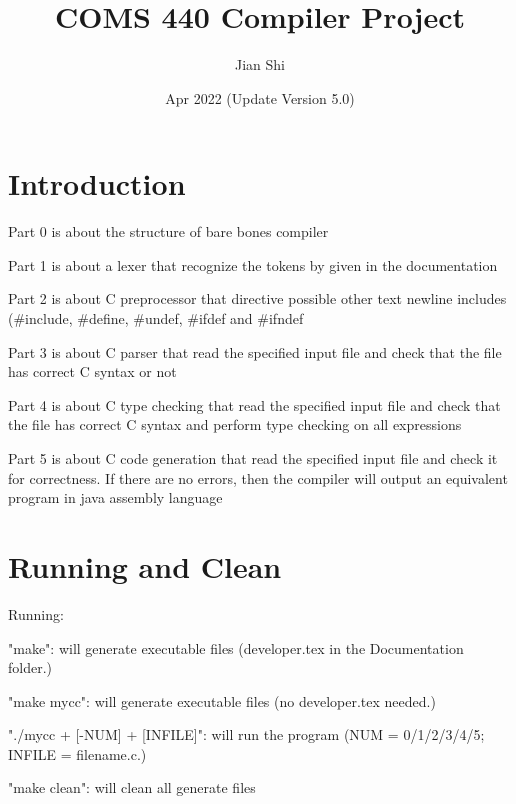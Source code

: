 \documentclass{article}
\title{COMS 440 Compiler Project}
\author{Jian Shi}
\date{Apr 2022 (Update Version 5.0)}
\begin{document}
\maketitle{}

\section{Introduction}

\par{Part 0 is about the structure of bare bones compiler}
\par{Part 1 is about a lexer that recognize the tokens by given in the documentation}
\par{Part 2 is about C preprocessor that directive possible other text newline includes (\#include, \#define, \#undef, \#ifdef and \#ifndef}
\par{Part 3 is about C parser that read the specified input file and check that the file has correct C syntax or not}
\par{Part 4 is about C type checking that read the specified input file and check that the file has correct C syntax and perform type checking on all expressions}
\par{Part 5 is about C code generation that read the specified input file and check it for correctness. If there are no errors, then the compiler will output an equivalent program in java assembly language}

\section{Running and Clean}

\par{Running:}
        \par\hspace*{1cm}"make": will generate executable files (developer.tex in the Documentation folder.)
        \par\hspace*{1cm}"make mycc": will generate executable files (no developer.tex needed.)
        \par\hspace*{1cm}"./mycc + [-NUM] + [INFILE]": will run the program (NUM = 0/1/2/3/4/5; INFILE = filename.c.)
        \par\hspace*{1cm}"make clean": will clean all generate files
\end{document}
